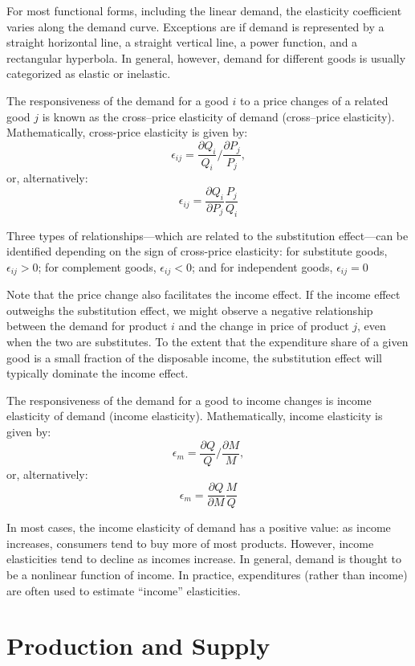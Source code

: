 \documentclass[
]{book}
\begin{document}
For most functional forms, including the linear demand, the elasticity coefficient varies along the demand curve. Exceptions are if demand is represented by a straight horizontal line, a straight vertical line, a power function, and a rectangular hyperbola. In general, however, demand for different goods is usually categorized as elastic or inelastic.

The responsiveness of the demand for a good \(i\) to a price changes of a related good \(j\) is known as the cross--price elasticity of demand (cross--price elasticity). Mathematically, cross-price elasticity is given by: \[\epsilon_{ij} = \frac{\partial Q_i}{Q_i}/\frac{\partial P_j}{P_j},\] or, alternatively: \[\epsilon_{ij} = \frac{\partial Q_i}{\partial P_j}\frac{P_j}{Q_i}\]

Three types of relationships---which are related to the substitution effect---can be identified depending on the sign of cross-price elasticity: for substitute goods, \(\epsilon_{ij} > 0\); for complement goods, \(\epsilon_{ij} < 0\); and for independent goods, \(\epsilon_{ij} = 0\)

Note that the price change also facilitates the income effect. If the income effect outweighs the substitution effect, we might observe a negative relationship between the demand for product \(i\) and the change in price of product \(j\), even when the two are substitutes. To the extent that the expenditure share of a given good is a small fraction of the disposable income, the substitution effect will typically dominate the income effect.

The responsiveness of the demand for a good to income changes is income elasticity of demand (income elasticity). Mathematically, income elasticity is given by: \[\epsilon_{m} = \frac{\partial Q}{Q}/\frac{\partial M}{M},\] or, alternatively: \[\epsilon_{m} = \frac{\partial Q}{\partial M}\frac{M}{Q}\]

In most cases, the income elasticity of demand has a positive value: as income increases, consumers tend to buy more of most products. However, income elasticities tend to decline as incomes increase. In general, demand is thought to be a nonlinear function of income. In practice, expenditures (rather than income) are often used to estimate ``income'' elasticities.

\hypertarget{production-and-supply}{%
\chapter{Production and Supply}\label{production-and-supply}}
\end{document}
